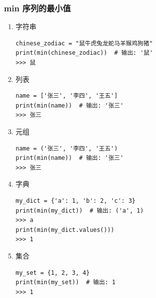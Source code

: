 \subsubsection{min 序列的最小值}
\begin{enumerate}[label=\arabic*)]
    \item 字符串
\begin{lstlisting}[style=demostyle,numbers=none]
chinese_zodiac = "鼠牛虎兔龙蛇马羊猴鸡狗猪"
print(min(chinese_zodiac))  # 输出: '鼠'
>>> 鼠
\end{lstlisting}

    \item 列表
\begin{lstlisting}[style=demostyle,numbers=none]
name = ['张三', '李四', '王五']
print(min(name))  # 输出: '张三'
>>> 张三
\end{lstlisting}

    \item 元组
\begin{lstlisting}[style=demostyle,numbers=none]
name = ('张三', '李四', '王五')
print(min(name))  # 输出: '张三'
>>> 张三
\end{lstlisting}

    \item 字典
\begin{lstlisting}[style=demostyle,numbers=none]
my_dict = {'a': 1, 'b': 2, 'c': 3}
print(min(my_dict))  # 输出: ('a', 1)
>>> a
print(min(my_dict.values()))
>>> 1
\end{lstlisting}

    \item 集合
\begin{lstlisting}[style=demostyle,numbers=none]
my_set = {1, 2, 3, 4}
print(min(my_set))  # 输出: 1
>>> 1
\end{lstlisting}

\end{enumerate}


